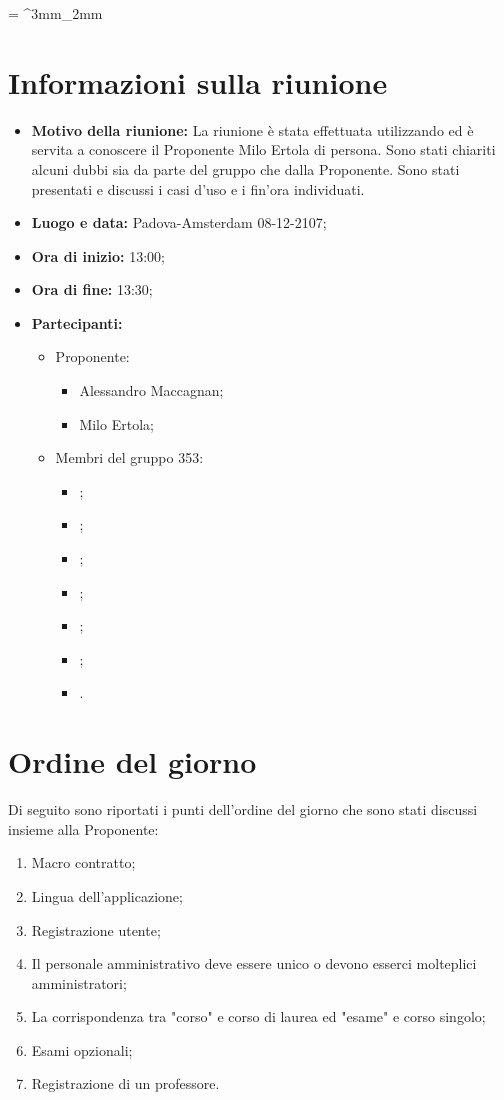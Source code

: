 \documentclass[VER-2017-12-08.tex]{subfiles}
\begin{document}
\tabulinesep = ^3mm_2mm
\chapter{Informazioni sulla riunione}
\begin{itemize}
	\item \textbf{Motivo della riunione:} La riunione è stata effettuata utilizzando  ed è servita a conoscere il Proponente Milo Ertola di persona. Sono stati chiariti alcuni dubbi sia da parte del gruppo \gruppo che dalla Proponente. Sono stati presentati e discussi i casi d'uso e i  fin'ora individuati.

	\item \textbf{Luogo e data:} Padova-Amsterdam 08-12-2107;
	\item \textbf{Ora di inizio:} 13:00;
	\item \textbf{Ora di fine:} 13:30;
	\item \textbf{Partecipanti:}
	\begin{itemize}
		\item Proponente:
		\begin{itemize}
			\item Alessandro Maccagnan;
			\item Milo Ertola;
		\end{itemize}
		\item Membri del gruppo 353:
		\begin{itemize}
			\item \Davide;
			\item \Elena;
			\item \Gianluca;
			\item \Mirco;
			\item \Parwinder;
			\item \Riccardo;
			\item \Valentina.
		\end{itemize}
	\end{itemize}
\end{itemize}
\chapter{Ordine del giorno}	
Di seguito sono riportati i punti dell'ordine del giorno che sono stati discussi insieme alla Proponente:
\begin{enumerate}
	\item Macro contratto; 
	\item Lingua dell'applicazione;
	\item Registrazione utente;
	\item Il personale amministrativo deve essere unico o devono esserci molteplici amministratori;
	\item La corrispondenza tra  "corso" e corso di laurea ed "esame" e corso singolo;
	\item Esami opzionali;
	\item Registrazione di un professore.
\end{enumerate}
\end{document}
